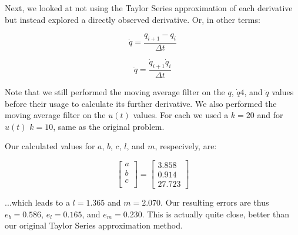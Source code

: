 \documentclass{article}
\begin{document}
Next, we looked at not using the Taylor Series approximation of each derivative but instead explored a directly observed derivative. Or, in other terms:

\begin{equation}
    \dot{q} = \frac{q_{i+1}-q_i}{\Delta t}
\end{equation}

\begin{equation}
    \ddot{q} = \frac{\dot{q}_{i+1}\dot{q}_i}{\Delta t}
\end{equation}

Note that we still performed the moving average filter on the $q$, $\dot{q}4$, and $\ddot{q}$ values before their usage to calculate its further derivative. We also performed the moving average filter on the $u(t)$ values. For each we used a $k=20$ and for $u(t)$ $k=10$, same as the original problem.

Our calculated values for $a$, $b$, $c$, $l$, and $m$, respecively, are:

\begin{equation}
    \begin{bmatrix}
        a \\
        b \\
        c \\
    \end{bmatrix} = \begin{bmatrix}
        3.858 \\
        0.914 \\
        27.723
    \end{bmatrix}
\end{equation}

...which leads to a $l=1.365$ and $m=2.070$. Our resulting errors are thus $e_b = 0.586$, $e_l = 0.165$, and $e_m = 0.230$. This is actually quite close, better than our original Taylor Series approximation method.
\end{document}
